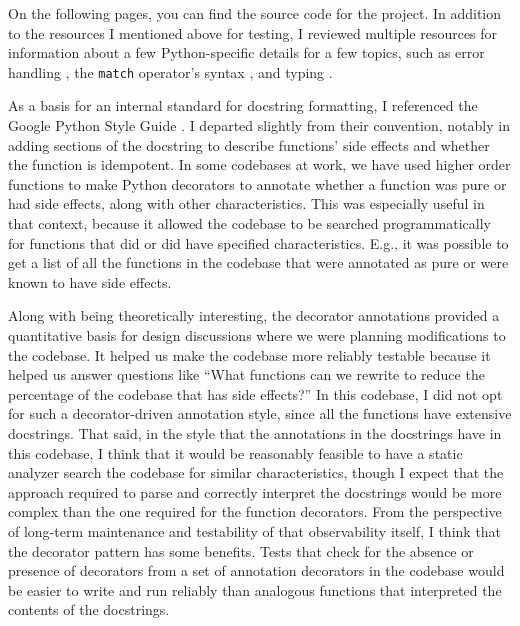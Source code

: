 \documentclass[10pt,letterpaper,final]{report}
\begin{document}
On the following pages, you can find the source code for the project. In addition to the resources I mentioned above for testing, I reviewed multiple resources for information about a few Python-specific details for a few topics, such as error handling \textcite{PythonDocumentationErrorsAndExceptions}, the \texttt{match} operator's syntax \textcite{PythonEnhancementProposalsPEP0636}, and typing \textcite{PythonDocumentationTypingLiterals}.

As a basis for an internal standard for docstring formatting, I referenced the Google Python Style Guide \textcite{GooglePythonStyleGuide}. I departed slightly from their convention, notably in adding sections of the docstring to describe functions' side effects and whether the function is idempotent. In some codebases at work, we have used higher order functions to make Python decorators to annotate whether a function was pure or had side effects, along with other characteristics. This was especially useful in that context, because it allowed the codebase to be searched programmatically for functions that did or did have specified characteristics. E.g., it was possible to get a list of all the functions in the codebase that were annotated as pure or were known to have side effects.

Along with being theoretically interesting, the decorator annotations provided a quantitative basis for design discussions where we were planning modifications to the codebase. It helped us make the codebase more reliably testable because it helped us answer questions like ``What functions can we rewrite to reduce the percentage of the codebase that has side effects?'' In this codebase, I did not opt for such a decorator-driven annotation style, since all the functions have extensive docstrings. That said, in the style that the annotations in the docstrings have in this codebase, I think that it would be reasonably feasible to have a static analyzer search the codebase for similar characteristics, though I expect that the approach required to parse and correctly interpret the docstrings would be more complex than the one required for the function decorators. From the perspective of long-term maintenance and testability of that observability itself, I think that the decorator pattern has some benefits. Tests that check for the absence or presence of decorators from a set of annotation decorators in the codebase would be easier to write and run reliably than analogous functions that interpreted the contents of the docstrings.
\end{document}
